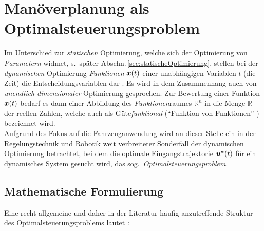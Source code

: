 \section{Manöverplanung als Optimalsteuerungsproblem} \label{sec:unendlichdim_opt}
Im Unterschied zur \emph{statischen} Optimierung, welche sich der Optimierung von \emph{Parametern} widmet, s.\ später Abschn.\,\ref{sec:statischeOptimierung}, stellen bei der \emph{dynamischen} Optimierung \emph{Funktionen} $\boldsymbol{x}(t)$ einer unabhängigen Variablen $t$ (\zB die Zeit) die Entscheidungsvariablen dar \cite{foellingeroptimal, bertsekas2007, papageorgiou2012optimierung}. Es wird in dem Zusammenhang auch von \emph{unendlich-dimensionaler} Optimierung gesprochen. Zur Bewertung einer Funktion $\boldsymbol{x}(t)$ bedarf es dann einer Abbildung des \emph{Funktionen}raumes $\mathbb R^n$ in die Menge $\mathbb R$ der reellen Zahlen, welche auch als Güte\emph{funktional} ("`Funktion von Funktionen"' \cite{papageorgiou2012optimierung}) bezeichnet wird. \\
Aufgrund des Fokus auf die Fahrzeuganwendung wird an dieser Stelle ein in der Regelungstechnik und Robotik weit verbreiteter Sonderfall der dynamischen Optimierung betrachtet, bei dem die optimale Eingangstrajektorie $\boldsymbol{u^\ast}(t)$ für ein dynamisches System gesucht wird, das sog.\ \emph{Optimalsteuerungsproblem}.


\subsection{Mathematische Formulierung}
\label{sec:direkte_opt_dynamisch}
Eine recht allgemeine und daher in der Literatur häufig anzutreffende Struktur des Optimalsteuerungsproblems lautet \cite{graichen2014SkriptOpt}:

